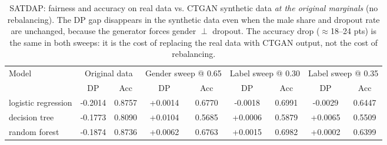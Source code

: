 \begin{table}[ht]
\centering\footnotesize
\caption{SATDAP: fairness and accuracy on real data vs. CTGAN synthetic data
\emph{at the original marginals} (no rebalancing). The DP gap disappears in the
synthetic data even when the male share and dropout rate are unchanged, because
the generator forces gender $\perp$ dropout. The accuracy drop ($\approx$18--24 pts)
is the same in both sweeps: it is the cost of replacing the real data with CTGAN
output, not the cost of rebalancing.}
\label{tab:matched_marginals}
\begin{tabular}{l c c c c c c c c}
\toprule
Model & \multicolumn{2}{c}{Original data} &
\multicolumn{2}{c}{Gender sweep @ 0.65} &
\multicolumn{2}{c}{Label sweep @ 0.30} &
\multicolumn{2}{c}{Label sweep @ 0.35} \\
 & DP & Acc & DP & Acc & DP & Acc & DP & Acc \\
\midrule
logistic regression  & -0.2014 & 0.8757 & +0.0014 & 0.6770 & -0.0018 & 0.6991 & -0.0029 & 0.6447 \\
decision tree        & -0.1773 & 0.8090 & +0.0104 & 0.5685 & +0.0006 & 0.5879 & +0.0065 & 0.5509 \\
random forest        & -0.1874 & 0.8736 & +0.0062 & 0.6763 & +0.0015 & 0.6982 & +0.0002 & 0.6399 \\\bottomrule
\end{tabular}
\end{table}
